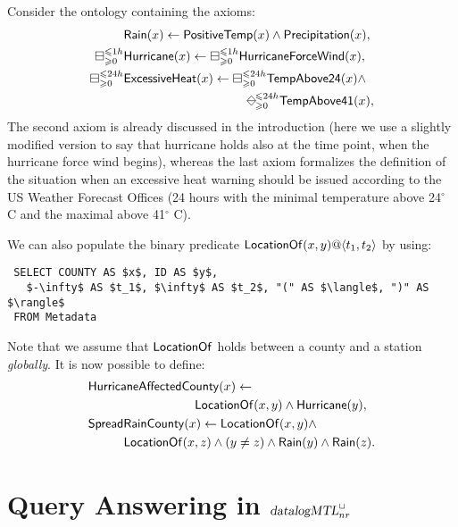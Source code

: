 \documentclass{article}
\newcommand{\diamondminus}{%
  \raisebox{-.15ex}{\begin{tikzpicture}
    \useasboundingbox (-0.7ex, -0.9ex) rectangle (0.7ex, 0.9ex);
    \node (w) at (-0.8ex,0) {};
    \node (e) at (+0.8ex,0) {};
    \node (s) at (0,-.9ex) {};
    \node (n) at (0,+.9ex) {};
    \draw (n.center) -- (e.center) -- (s.center) -- (w.center) -- (n.center);
    \draw (e.center) -- (w.center);
  \end{tikzpicture}}}
\newcommand{\dMTL}{\textsl{datalogMTL}}
\begin{document}
{{Consider the ontology containing the axioms:
%
 \begin{align*}
     & {\sf Rain}(x)   \leftarrow   {\sf PositiveTemp}(x) \land  {\sf Precipitation}(x),\\
     \boxminus^{\leqslant 1h}_{\geqslant 0} & \mathsf{Hurricane}(x) \leftarrow  \boxminus^{\leqslant 1h}_{\geqslant 0} \mathsf{HurricaneForceWind}(x),\\
     \boxminus^{\leqslant 24 h}_{\geqslant 0} & \mathsf{ExcessiveHeat}(x) \leftarrow  \boxminus^{\leqslant 24 h}_{\geqslant 0} \mathsf{TempAbove24}(x) \land \\
      &\hspace{3.5cm} \diamondminus^{\leqslant 24 h}_{\geqslant 0} \mathsf{TempAbove41}(x),
 \end{align*}
%
The second axiom is already discussed in the introduction (here we use a slightly modified version to say that hurricane holds also at the time point, when the hurricane force wind begins), whereas the last axiom formalizes the definition of the situation when an excessive heat warning should be issued according to the US Weather Forecast Offices (24 hours with the minimal temperature above 24$^\circ$ C and the maximal above  41$^\circ$ C).

 We can also populate the binary
 predicate ${\sf LocationOf}(x, y)@\langle t_1, t_2 \rangle$ by using:
%
\begin{lstlisting}
 SELECT COUNTY AS $x$, ID AS $y$,
   $-\infty$ AS $t_1$, $\infty$ AS $t_2$, "(" AS $\langle$, ")" AS $\rangle$
 FROM Metadata
\end{lstlisting}
%
Note that we assume that ${\sf LocationOf}$ holds between a county and a station \emph{globally}. It is now possible to define:
%
\begin{align*}
  &{\sf HurricaneAffectedCounty}(x) \leftarrow\\
  & \hspace{3cm} {\sf LocationOf} (x,y) \land {\sf Hurricane}(y),\\
  &{\sf SpreadRainCounty}(x) \leftarrow {\sf LocationOf}(x,y) \land \\
  &\hspace{1cm}{\sf LocationOf}(x,z) \land
  (y \neq z) \land {\sf Rain}(y) \land {\sf Rain}(z).
\end{align*}

\section{Query Answering in $\dMTL^\Box_{nr}$}

}}
\end{document}
